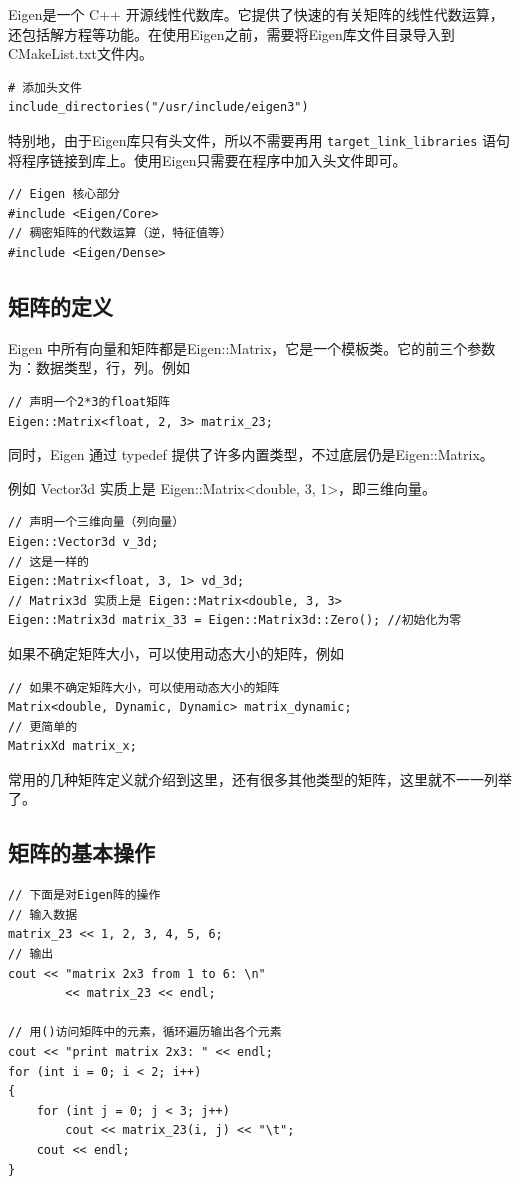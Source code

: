 Eigen是一个 C++ 开源线性代数库。它提供了快速的有关矩阵的线性代数运算，还包括解方程等功能。在使用Eigen之前，需要将Eigen库文件目录导入到CMakeList.txt文件内。

\begin{lstlisting}[style=bash]
# 添加头文件
include_directories("/usr/include/eigen3")
\end{lstlisting}

特别地，由于Eigen库只有头文件，所以不需要再用 \verb|target_link_libraries| 语句将程序链接到库上。使用Eigen只需要在程序中加入头文件即可。

\begin{lstlisting}[style=C++]
// Eigen 核心部分
#include <Eigen/Core>
// 稠密矩阵的代数运算（逆，特征值等）
#include <Eigen/Dense>
\end{lstlisting}

\subsection{矩阵的定义}
Eigen 中所有向量和矩阵都是Eigen::Matrix，它是一个模板类。它的前三个参数为：数据类型，行，列。例如

\begin{lstlisting}[style=C++]
// 声明一个2*3的float矩阵
Eigen::Matrix<float, 2, 3> matrix_23;
\end{lstlisting}

同时，Eigen 通过 typedef 提供了许多内置类型，不过底层仍是Eigen::Matrix。

例如 Vector3d 实质上是 Eigen::Matrix<double, 3, 1>，即三维向量。

\begin{lstlisting}[style=C++]
// 声明一个三维向量（列向量）
Eigen::Vector3d v_3d;
// 这是一样的
Eigen::Matrix<float, 3, 1> vd_3d;
// Matrix3d 实质上是 Eigen::Matrix<double, 3, 3>
Eigen::Matrix3d matrix_33 = Eigen::Matrix3d::Zero(); //初始化为零
\end{lstlisting}

如果不确定矩阵大小，可以使用动态大小的矩阵，例如
\begin{lstlisting}[style=C++]
// 如果不确定矩阵大小，可以使用动态大小的矩阵
Matrix<double, Dynamic, Dynamic> matrix_dynamic;
// 更简单的
MatrixXd matrix_x;
\end{lstlisting}

常用的几种矩阵定义就介绍到这里，还有很多其他类型的矩阵，这里就不一一列举了。


\subsection{矩阵的基本操作}
\begin{lstlisting}[style=C++]
// 下面是对Eigen阵的操作
// 输入数据
matrix_23 << 1, 2, 3, 4, 5, 6;
// 输出
cout << "matrix 2x3 from 1 to 6: \n"
        << matrix_23 << endl;

// 用()访问矩阵中的元素，循环遍历输出各个元素
cout << "print matrix 2x3: " << endl;
for (int i = 0; i < 2; i++)
{
    for (int j = 0; j < 3; j++)
        cout << matrix_23(i, j) << "\t";
    cout << endl;
}
\end{lstlisting}


